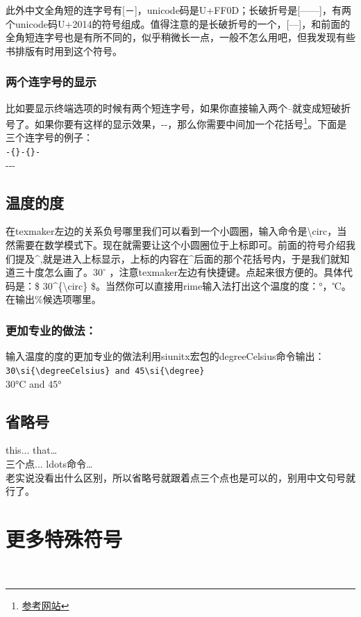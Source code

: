 \documentclass[11pt,oneside]{book}
\begin{document}
此外中文全角短的连字号有[－]，unicode码是U+FF0D；长破折号是[——]，有两个unicode码U+2014的符号组成。值得注意的是长破折号的一个，[—]，和前面的全角短连字号也是有所不同的，似乎稍微长一点，一般不怎么用吧，但我发现有些书排版有时用到这个符号。

\subsubsection{两个连字号的显示}
比如要显示终端选项的时候有两个短连字号，如果你直接输入两个--就变成短破折号了。如果你要有这样的显示效果，-{}-，那么你需要中间加一个花括号\footnote{\href{http://tex.stackexchange.com/questions/9813/how-can-i-stop-latex-from-converting-two-hyphens-to-a-single-hyphen-when-loading}{参考网站}}。下面是三个连字号的例子：\\
\verb+-{}-{}-+\\
-{}-{}-


\subsection{温度的度}
在texmaker左边的关系负号哪里我们可以看到一个小圆圈，输入命令是\textbackslash circ，当然需要在数学模式下。现在就需要让这个小圆圈位于上标即可。前面的符号介绍我们提及\^{},就是进入上标显示，上标的内容在\^{}后面的那个花括号内，于是我们就知道三十度怎么画了。$ 30^{\circ} $ ，注意texmaker左边有快捷键。点起来很方便的。具体代码是：\$ 30\^{}\{\textbackslash circ\} \$。当然你可以直接用rime输入法打出这个温度的度：°，℃。在输出\%候选项哪里。

\subsubsection{更加专业的做法：}
输入温度的度的更加专业的做法利用siunitx宏包的degreeCelsius命令输出：\\
\verb+30\si{\degreeCelsius} and 45\si{\degree}+\\
30\si{\degreeCelsius} and 45\si{\degree}


\subsection{省略号}
this...   that\ldots   \\
三个点...   ldots命令\ldots  \\
老实说没看出什么区别，所以省略号就跟着点三个点也是可以的，别用中文句号就行了。



\section{更多特殊符号}
{\fontsize{40pt}{20pt}\selectfont \color[HTML]{DE4815}  }
\end{document}
